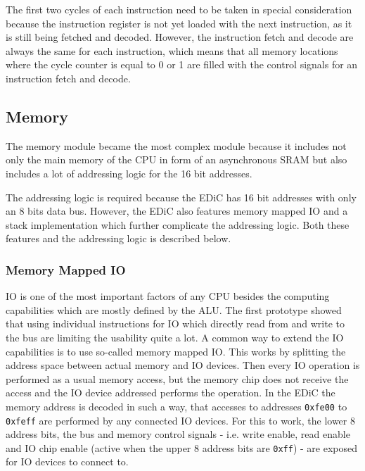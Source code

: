 The first two cycles of each instruction need to be taken in special consideration because the instruction register is not yet loaded with the next instruction, as it is still being fetched and decoded.
However, the instruction fetch and decode are always the same for each instruction, which means that all memory locations where the cycle counter is equal to 0 or 1 are filled with the control signals for an instruction fetch and decode.

\subsection{Memory}\label{sec:memory}
The memory module became the most complex module because it includes not only the main memory of the \gls{CPU} in form of an asynchronous \gls{SRAM} but also includes a lot of addressing logic for the 16 bit addresses.

The addressing logic is required because the \gls{EDiC} has 16 bit addresses with only an 8 bits data bus.
However, the \gls{EDiC} also features memory mapped \gls{IO} and a stack implementation which further complicate the addressing logic.
Both these features and the addressing logic is described below.

\subsubsection{Memory Mapped \gls{IO}}
\gls{IO} is one of the most important factors of any \gls{CPU} besides the computing capabilities which are mostly defined by the \gls{ALU}.
The first prototype showed that using individual instructions for \gls{IO} which directly read from and write to the bus are limiting the usability quite a lot.
A common way to extend the \gls{IO} capabilities is to use so-called memory mapped \gls{IO}.
This works by splitting the address space between actual memory and \gls{IO} devices.
Then every \gls{IO} operation is performed as a usual memory access, but the memory chip does not receive the access and the \gls{IO} device addressed performs the operation.
In the \gls{EDiC} the memory address is decoded in such a way, that accesses to addresses \texttt{0xfe00} to \texttt{0xfeff} are performed by any connected \gls{IO} devices.
For this to work, the lower 8 address bits, the bus and memory control signals - i.e. write enable, read enable and \gls{IO} chip enable (active when the upper 8 address bits are \texttt{0xff}) - are exposed for \gls{IO} devices to connect to.

